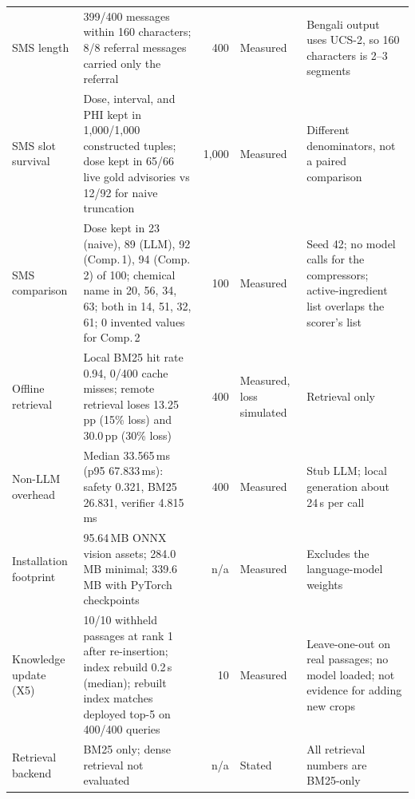 \documentclass[11pt,a4paper]{article}
\begin{document}
\begin{minipage}{\textwidth}
\begin{tabularx}{\textwidth}{@{}p{} p{} r p{} X@{}}
SMS length & 399/400 messages within 160 characters; 8/8 referral messages carried only the referral & 400 & Measured & Bengali output uses UCS-2, so 160 characters is 2--3 segments \\
SMS slot survival & Dose, interval, and PHI kept in 1,000/1,000 constructed tuples; dose kept in 65/66 live gold advisories vs 12/92 for naive truncation & 1,000 & Measured & Different denominators, not a paired comparison \\
SMS comparison & Dose kept in 23 (naive), 89 (LLM), 92 (Comp.\,1), 94 (Comp.\,2) of 100; chemical name in 20, 56, 34, 63; both in 14, 51, 32, 61; 0 invented values for Comp.\,2 & 100 & Measured & Seed 42; no model calls for the compressors; active-ingredient list overlaps the scorer's list \\
Offline retrieval & Local BM25 hit rate 0.94, 0/400 cache misses; remote retrieval loses 13.25\,pp (15\% loss) and 30.0\,pp (30\% loss) & 400 & Measured, loss simulated & Retrieval only \\
Non-LLM overhead & Median 33.565\,ms (p95 67.833\,ms): safety 0.321, BM25 26.831, verifier 4.815\,ms & 400 & Measured & Stub LLM; local generation about 24\,s per call \\
Installation footprint & 95.64\,MB ONNX vision assets; 284.0\,MB minimal; 339.6\,MB with PyTorch checkpoints & n/a & Measured & Excludes the language-model weights \\
Knowledge update (X5) & 10/10 withheld passages at rank 1 after re-insertion; index rebuild 0.2\,s (median); rebuilt index matches deployed top-5 on 400/400 queries & 10 & Measured & Leave-one-out on real passages; no model loaded; not evidence for adding new crops \\
Retrieval backend & BM25 only; dense retrieval not evaluated & n/a & Stated & All retrieval numbers are BM25-only \\
\bottomrule
\end{tabularx}
\label{tab:evidence_b}
\end{minipage}
\end{document}

